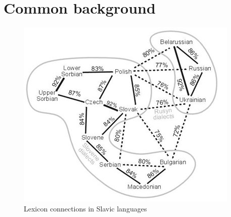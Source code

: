 \section{Common background}


\begin{figure}
	\includegraphics[width=\linewidth]{./sources/percents.jpg}
	\caption{Lexicon connections in Slavic languages}
	\label{fig:percent}
\end{figure}